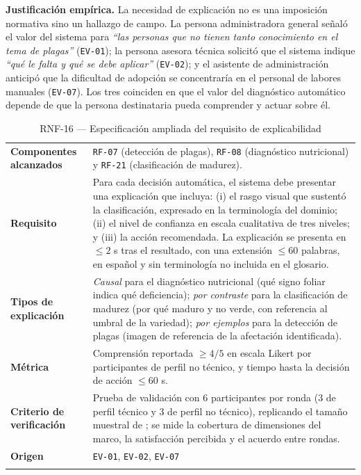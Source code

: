 \documentclass[11pt,a4paper]{article}
\newcommand{\id}[1]{\texttt{\begingroup\hyphenpenalty=10000\relax#1\endgroup}}
\renewcommand{\id}[1]{\texttt{#1}}
\begin{document}
\textbf{Justificación empírica.} La necesidad de explicación no es una imposición normativa sino un
hallazgo de campo. La persona administradora general señaló el valor del sistema para
\emph{``las personas que no tienen tanto conocimiento en el tema de plagas''} (\id{EV-01}); la
persona asesora técnica solicitó que el sistema indique \emph{``qué le falta y qué se debe
aplicar''} (\id{EV-02}); y el asistente de administración anticipó que la dificultad de adopción se
concentraría en el personal de labores manuales (\id{EV-07}). Los tres coinciden en que el valor del
diagnóstico automático depende de que la persona destinataria pueda comprender y actuar sobre él.

\begin{longtable}{|L{3.4cm}|L{12.0cm}|}
\hline
{}\\
\hline
\textbf{Componentes alcanzados} & \id{RF-07} (detección de plagas), \id{RF-08} (diagnóstico nutricional) y \id{RF-21} (clasificación de madurez). \\ \hline
\textbf{Requisito} & Para cada decisión automática, el sistema debe presentar una explicación que incluya: (i) el rasgo visual que sustentó la clasificación, expresado en la terminología del dominio; (ii) el nivel de confianza en escala cualitativa de tres niveles; y (iii) la acción recomendada. La explicación se presenta en $\leq 2$ s tras el resultado, con una extensión $\leq 60$ palabras, en español y sin terminología no incluida en el glosario. \\ \hline
\textbf{Tipos de explicación} & \emph{Causal} para el diagnóstico nutricional (qué signo foliar indica qué deficiencia); \emph{por contraste} para la clasificación de madurez (por qué maduro y no verde, con referencia al umbral de la variedad); \emph{por ejemplos} para la detección de plagas (imagen de referencia de la afectación identificada). \\ \hline
\textbf{Métrica} & Comprensión reportada $\geq 4/5$ en escala Likert por participantes de perfil no técnico, y tiempo hasta la decisión de acción $\leq 60$ s. \\ \hline
\textbf{Criterio de verificación} & Prueba de validación con 6 participantes por ronda (3 de perfil técnico y 3 de perfil no técnico), replicando el tamaño muestral de \cite{chazette2022}; se mide la cobertura de dimensiones del marco, la satisfacción percibida y el acuerdo entre rondas. \\ \hline
\textbf{Origen} & \footnotesize \id{EV-01}, \id{EV-02}, \id{EV-07} \\ \hline
\caption{RNF-16 --- Especificación ampliada del requisito de explicabilidad}
\end{longtable}
\end{document}
